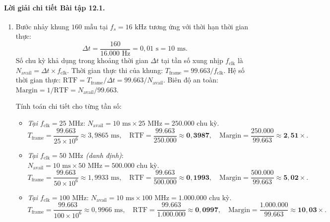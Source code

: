 \paragraph{Lời giải chi tiết Bài tập 12.1.}
\begin{enumerate}[label=(\alph*)]
    \item Bước nhảy khung $160\text{ mẫu}$ tại $f_s = 16\text{ kHz}$ tương ứng với thời hạn thời gian thực:
    \begin{equation}
        \Delta t = \frac{160}{16.000\text{ Hz}} = 0{,}01\text{ s} = 10\text{ ms}.
    \end{equation}
    Số chu kỳ khả dụng trong khoảng thời gian $\Delta t$ tại tần số xung nhịp $f_{\text{clk}}$ là $N_{\text{avail}} = \Delta t \times f_{\text{clk}}$.
    Thời gian thực thi của khung: $T_{\text{frame}} = 99.663 / f_{\text{clk}}$.
    Hệ số thời gian thực: $\text{RTF} = T_{\text{frame}} / \Delta t = 99.663 / N_{\text{avail}}$.
    Biên độ an toàn: $\text{Margin} = 1 / \text{RTF} = N_{\text{avail}} / 99.663$.
    
    Tính toán chi tiết cho từng tần số:
    \begin{itemize}
        \item \emph{Tại $f_{\text{clk}} = 25\text{ MHz}$}:
        $N_{\text{avail}} = 10\text{ ms} \times 25\text{ MHz} = 250.000\text{ chu kỳ}$.
        \begin{equation}
            T_{\text{frame}} = \frac{99.663}{25 \times 10^6} \approx 3{,}9865\text{ ms}, \quad \text{RTF} = \frac{99.663}{250.000} \approx \mathbf{0{,}3987}, \quad \text{Margin} = \frac{250.000}{99.663} \approx \mathbf{2{,}51\times}.
        \end{equation}
        \item \emph{Tại $f_{\text{clk}} = 50\text{ MHz}$ (danh định)}:
        $N_{\text{avail}} = 10\text{ ms} \times 50\text{ MHz} = 500.000\text{ chu kỳ}$.
        \begin{equation}
            T_{\text{frame}} = \frac{99.663}{50 \times 10^6} \approx 1{,}9933\text{ ms}, \quad \text{RTF} = \frac{99.663}{500.000} \approx \mathbf{0{,}1993}, \quad \text{Margin} = \frac{500.000}{99.663} \approx \mathbf{5{,}02\times}.
        \end{equation}
        \item \emph{Tại $f_{\text{clk}} = 100\text{ MHz}$}:
        $N_{\text{avail}} = 10\text{ ms} \times 100\text{ MHz} = 1.000.000\text{ chu kỳ}$.
        \begin{equation}
            T_{\text{frame}} = \frac{99.663}{100 \times 10^6} \approx 0{,}9966\text{ ms}, \quad \text{RTF} = \frac{99.663}{1.000.000} \approx \mathbf{0{,}0997}, \quad \text{Margin} = \frac{1.000.000}{99.663} \approx \mathbf{10{,}03\times}.
        \end{equation}
    \end{itemize}


\end{enumerate}
